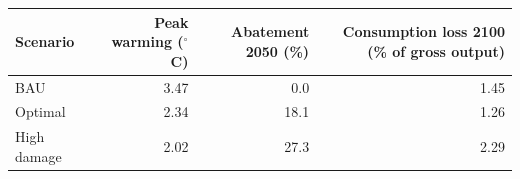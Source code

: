 \begin{tabular}{lrrr}
\toprule
Scenario & Peak warming ($^\circ$C) & Abatement 2050 (\%) & Consumption loss 2100 (\% of gross output) \\
\midrule
BAU & 3.47 & 0.0 & 1.45 \\
Optimal & 2.34 & 18.1 & 1.26 \\
High damage & 2.02 & 27.3 & 2.29 \\
\bottomrule
\end{tabular}
